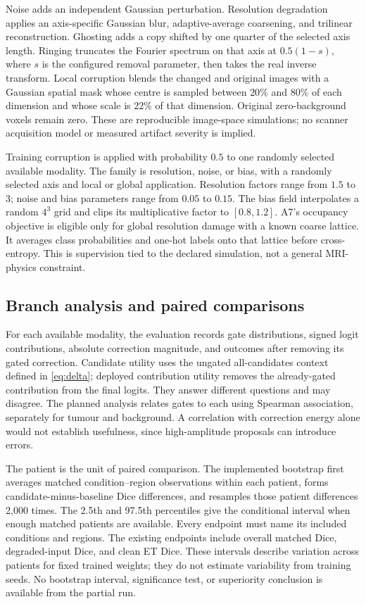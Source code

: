 \documentclass[conference]{IEEEtran}
\begin{document}
Noise adds an independent Gaussian perturbation. Resolution degradation applies an axis-specific Gaussian blur, adaptive-average coarsening, and trilinear reconstruction. Ghosting adds a copy shifted by one quarter of the selected axis length. Ringing truncates the Fourier spectrum on that axis at $0.5(1-s)$, where $s$ is the configured removal parameter, then takes the real inverse transform. Local corruption blends the changed and original images with a Gaussian spatial mask whose centre is sampled between $20\%$ and $80\%$ of each dimension and whose scale is $22\%$ of that dimension. Original zero-background voxels remain zero. These are reproducible image-space simulations; no scanner acquisition model or measured artifact severity is implied.

Training corruption is applied with probability $0.5$ to one randomly selected available modality. The family is resolution, noise, or bias, with a randomly selected axis and local or global application. Resolution factors range from $1.5$ to $3$; noise and bias parameters range from $0.05$ to $0.15$. The bias field interpolates a random $4^3$ grid and clips its multiplicative factor to $[0.8,1.2]$. A7's occupancy objective is eligible only for global resolution damage with a known coarse lattice. It averages class probabilities and one-hot labels onto that lattice before cross-entropy. This is supervision tied to the declared simulation, not a general MRI-physics constraint.

\subsection{Branch analysis and paired comparisons}
For each available modality, the evaluation records gate distributions, signed logit contributions, absolute correction magnitude, and outcomes after removing its gated correction. Candidate utility uses the ungated all-candidates context defined in \eqref{eq:delta}; deployed contribution utility removes the already-gated contribution from the final logits. They answer different questions and may disagree. The planned analysis relates gates to each using Spearman association, separately for tumour and background. A correlation with correction energy alone would not establish usefulness, since high-amplitude proposals can introduce errors.

The patient is the unit of paired comparison. The implemented bootstrap first averages matched condition--region observations within each patient, forms candidate-minus-baseline Dice differences, and resamples those patient differences 2,000 times. The 2.5th and 97.5th percentiles give the conditional interval when enough matched patients are available. Every endpoint must name its included conditions and regions. The existing endpoints include overall matched Dice, degraded-input Dice, and clean ET Dice. These intervals describe variation across patients for fixed trained weights; they do not estimate variability from training seeds. No bootstrap interval, significance test, or superiority conclusion is available from the partial run.
\end{document}
